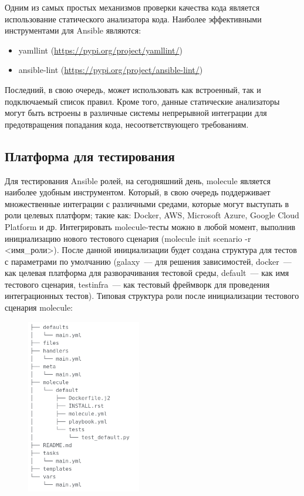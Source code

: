 \documentclass[10pt, a5paper]{article}
\begin{document}
Одним из самых простых механизмов проверки качества кода является использование статического анализатора кода. Наиболее эффективными инструментами для Ansible являются:

\begin{itemize}
  \item yamllint (\url{https://pypi.org/project/yamllint/})
  \item ansible-lint (\url{https://pypi.org/project/ansible-lint/})
\end{itemize}

Последний, в свою очередь, может использовать как встроенный, так и подключаемый список правил.
Кроме того, данные статические анализаторы могут быть встроены в различные системы непрерывной интеграции для предотвращения попадания кода, несоответствующего требованиям.

\subsection*{Платформа для тестирования}

Для тестирования Ansible ролей, на сегодняшний день, molecule является наиболее удобным инструментом. Который, в свою очередь поддерживает множественные интеграции с различными средами, которые могут выступать в роли целевых платформ; такие как: Docker, AWS, Microsoft Azure, Google Cloud Platform и др.
Интегрировать molecule-тесты можно в любой момент, выполнив инициализацию нового тестового сценария (molecule init scenario -r \textless{}имя\_роли\textgreater{}). После данной инициализации будет создана структура для тестов с параметрами по умолчанию (galaxy~--- для решения зависимостей, docker~--- как целевая платформа для разворачивания тестовой среды, default~--- как имя тестового сценария, testinfra~--- как тестовый фреймворк для проведения интеграционных тестов).
Типовая структура роли после инициализации тестового сценария molecule:
\newpage
\begin{figure}[h!]
  \centering
  \includegraphics[width=5cm]{05_2018_Kharkevich5.png}
  \label{Kharkevich2}
\end{figure}
\end{document}
